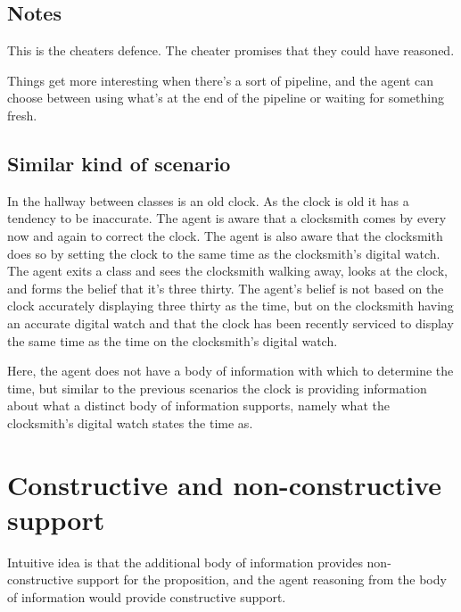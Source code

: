 \documentclass[10pt]{article}
\begin{document}
\subsection{Notes}
\label{sec:notes}

\begin{note}
  This is the cheaters defence.
  The cheater promises that they could have reasoned.
\end{note}

\begin{note}
  Things get more interesting when there's a sort of pipeline, and the agent can choose between using what's at the end of the pipeline or waiting for something fresh.
\end{note}

\subsection{Similar kind of scenario}
\label{sec:simil-kind-scen}

\begin{scenario}[Clocksmith]
  In the hallway between classes is an old clock.
  As the clock is old it has a tendency to be inaccurate.
  The agent is aware that a clocksmith comes by every now and again to correct the clock.
  The agent is also aware that the clocksmith does so by setting the clock to the same time as the clocksmith's digital watch.
  The agent exits a class and sees the clocksmith walking away, looks at the clock, and forms the belief that it's three thirty.
  The agent's belief is not based on the clock accurately displaying three thirty as the time, but on the clocksmith having an accurate digital watch and that the clock has been recently serviced to display the same time as the time on the clocksmith's digital watch.
\end{scenario}

Here, the agent does not have a body of information with which to determine the time, but similar to the previous scenarios the clock is providing information about what a distinct body of information supports, namely what the clocksmith's digital watch states the time as.

\section{Constructive and non-constructive support}
\label{sec:constr-non-constr}

Intuitive idea is that the additional body of information provides non-constructive support for the proposition, and the agent reasoning from the body of information would provide constructive support.
\end{document}
